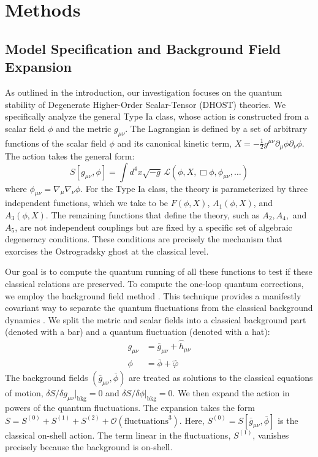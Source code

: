 \documentclass[twocolumn]{aastex631}
\begin{document}
\section{Methods}
\label{sec:methods}
\subsection{Model Specification and Background Field Expansion}
As outlined in the introduction, our investigation focuses on the quantum stability of Degenerate Higher-Order Scalar-Tensor (DHOST) theories. We specifically analyze the general Type Ia class, whose action is constructed from a scalar field $\phi$ and the metric $g_{\mu\nu}$. The Lagrangian is defined by a set of arbitrary functions of the scalar field $\phi$ and its canonical kinetic term, $X = - \frac{1}{2} g^{\mu\nu} \partial_\mu\phi \partial_\nu\phi$. The action takes the general form:
\begin{equation}S[g_{\mu\nu}, \phi] = \int d^4x \sqrt{-g} \, \mathcal{L}(\phi, X, \Box\phi, \phi_{\mu\nu}, \dots)\end{equation}
where $\phi_{\mu\nu} = \nabla_\mu \nabla_\nu \phi$. For the Type Ia class, the theory is parameterized by three independent functions, which we take to be $F(\phi, X)$, $A_1(\phi, X)$, and $A_3(\phi, X)$. The remaining functions that define the theory, such as $A_2, A_4,$ and $A_5$, are not independent couplings but are fixed by a specific set of algebraic degeneracy conditions. These conditions are precisely the mechanism that exorcises the Ostrogradsky ghost at the classical level.

Our goal is to compute the quantum running of all these functions to test if these classical relations are preserved. \citep{ballardini2022typeiasupernovaedata}
To compute the one-loop quantum corrections, we employ the background field method \citep{chen1995differentialrenormalizationscalarfield,buchbinder1997backgroundfieldmethodn}. This technique provides a manifestly covariant way to separate the quantum fluctuations from the classical background dynamics \citep{buchbinder1997backgroundfieldmethodn}. We split the metric and scalar fields into a classical background part (denoted with a bar) and a quantum fluctuation (denoted with a hat):
\begin{align}g_{\mu\nu} &= \bar{g}_{\mu\nu} + \hat{h}_{\mu\nu} \\\phi &= \bar{\phi} + \hat{\varphi}\end{align}
The background fields $(\bar{g}_{\mu\nu}, \bar{\phi})$ are treated as solutions to the classical equations of motion, $\delta S / \delta g_{\mu\nu}|_{\text{bkg}} = 0$ and $\delta S / \delta \phi|_{\text{bkg}} = 0$. We then expand the action in powers of the quantum fluctuations. The expansion takes the form $S = S^{(0)} + S^{(1)} + S^{(2)} + \mathcal{O}(\text{fluctuations}^3)$. Here, $S^{(0)} = S[\bar{g}_{\mu\nu}, \bar{\phi}]$ is the classical on-shell action. The term linear in the fluctuations, $S^{(1)}$, vanishes precisely because the background is on-shell.
\end{document}
